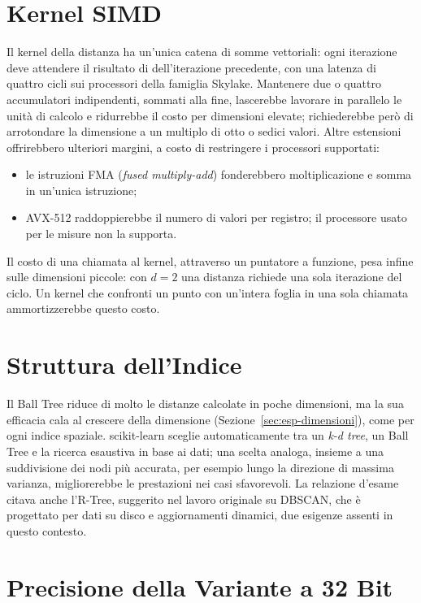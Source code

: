 \section{Kernel SIMD}

Il kernel della distanza ha un'unica catena di somme vettoriali: ogni iterazione deve attendere il risultato di  dell'iterazione precedente, con una latenza di quattro cicli sui processori della famiglia Skylake. Mantenere due o quattro accumulatori indipendenti, sommati alla fine, lascerebbe lavorare in parallelo le unità di calcolo e ridurrebbe il costo per dimensioni elevate; richiederebbe però di arrotondare la dimensione a un multiplo di otto o sedici valori. Altre estensioni offrirebbero ulteriori margini, a costo di restringere i processori supportati:

\begin{itemize}
    \item le istruzioni FMA (\emph{fused multiply-add}) fonderebbero moltiplicazione e somma in un'unica istruzione;
    \item AVX-512 raddoppierebbe il numero di valori per registro; il processore usato per le misure non la supporta.
\end{itemize}

Il costo di una chiamata al kernel, attraverso un puntatore a funzione, pesa infine sulle dimensioni piccole: con $d = 2$ una distanza richiede una sola iterazione del ciclo. Un kernel che confronti un punto con un'intera foglia in una sola chiamata ammortizzerebbe questo costo.

\section{Struttura dell'Indice}

Il Ball Tree riduce di molto le distanze calcolate in poche dimensioni, ma la sua efficacia cala al crescere della dimensione (Sezione~\ref{sec:esp-dimensioni}), come per ogni indice spaziale. scikit-learn sceglie automaticamente tra un \emph{k-d tree}, un Ball Tree e la ricerca esaustiva in base ai dati; una scelta analoga, insieme a una suddivisione dei nodi più accurata, per esempio lungo la direzione di massima varianza, migliorerebbe le prestazioni nei casi sfavorevoli. La relazione d'esame citava anche l'R-Tree, suggerito nel lavoro originale su DBSCAN, che è progettato per dati su disco e aggiornamenti dinamici, due esigenze assenti in questo contesto.

\section{Precisione della Variante a 32 Bit}

